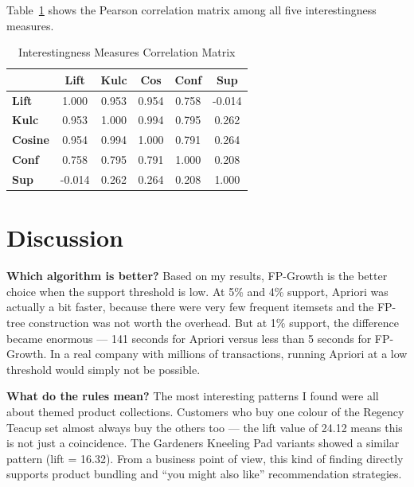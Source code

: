 \documentclass[conference]{IEEEtran}
\begin{document}
Table~\ref{tab:corr} shows the Pearson correlation matrix among all five interestingness measures.

\begin{table}[htbp]
    \caption{Interestingness Measures Correlation Matrix}
    \begin{center}
        \begin{tabular}{|l|c|c|c|c|c|}
            \hline
            & \textbf{Lift} & \textbf{Kulc} & \textbf{Cos} & \textbf{Conf} & \textbf{Sup} \\
            \hline
            \textbf{Lift} & 1.000 & 0.953 & 0.954 & 0.758 & -0.014 \\
            \hline
            \textbf{Kulc} & 0.953 & 1.000 & 0.994 & 0.795 & 0.262 \\
            \hline
            \textbf{Cosine} & 0.954 & 0.994 & 1.000 & 0.791 & 0.264 \\
            \hline
            \textbf{Conf} & 0.758 & 0.795 & 0.791 & 1.000 & 0.208 \\
            \hline
            \textbf{Sup} & -0.014 & 0.262 & 0.264 & 0.208 & 1.000 \\
            \hline
        \end{tabular}
        \label{tab:corr}
    \end{center}
\end{table}

\section{Discussion}
\label{sec:discussion}

\textbf{Which algorithm is better?} Based on my results, FP-Growth is the better choice when the support threshold is low. At 5\% and 4\% support, Apriori was actually a bit faster, because there were very few frequent itemsets and the FP-tree construction was not worth the overhead. But at 1\% support, the difference became enormous — 141 seconds for Apriori versus less than 5 seconds for FP-Growth. In a real company with millions of transactions, running Apriori at a low threshold would simply not be possible.

\textbf{What do the rules mean?} The most interesting patterns I found were all about themed product collections. Customers who buy one colour of the Regency Teacup set almost always buy the others too — the lift value of 24.12 means this is not just a coincidence. The Gardeners Kneeling Pad variants showed a similar pattern (lift = 16.32). From a business point of view, this kind of finding directly supports product bundling and ``you might also like'' recommendation strategies.
\end{document}

